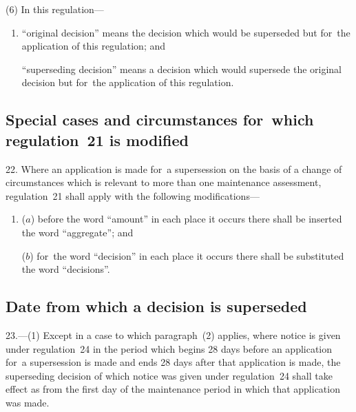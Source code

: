 \documentclass[a4paper,12pt]{article}
\begin{document}
(6) In this regulation---
\begin{enumerate}\item[]
“original decision” means the decision which would be superseded but for~the application of this regulation; and

“superseding decision” means a decision which would supersede the original decision but for~the application of this regulation.
\end{enumerate}


\subsection[22. Special cases and circumstances for~which regulation~21 is modified]{Special cases and circumstances for~which regulation~21 is modified}

22.  Where an application is made for~a supersession on the basis of a change of circumstances which is relevant to more than one maintenance assessment, regulation~21 shall apply with the following modifications---
\begin{enumerate}\item[]
($a$) before the word “amount” in each place it occurs there shall be inserted the word “aggregate”; and

($b$) for~the word “decision” in each place it occurs there shall be substituted the word “decisions”.
\end{enumerate}

\subsection[23. Date from which a decision is superseded]{Date from which a decision is superseded}

23.—(1) Except in a case to which paragraph~(2) applies, where notice is given under regulation~24 in the period which begins 28 days before an application for~a supersession is made and ends 28 days after that application is made, the superseding decision of which notice was given under regulation~24 shall take effect as from the first day of the maintenance period in which that application was made.

\end{document}
